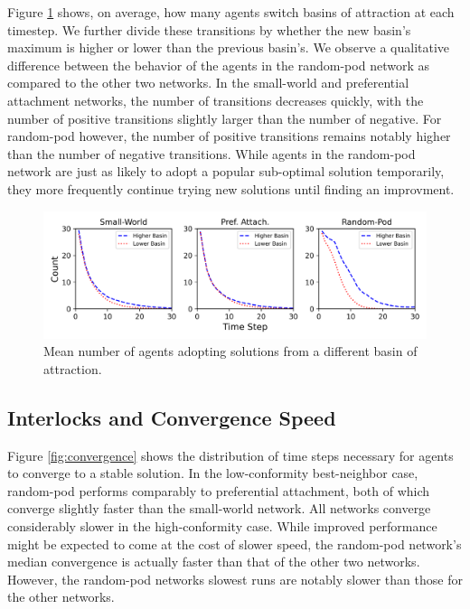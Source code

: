 \documentclass[manuscript,screen,review,acmsmall]{acmart}
\begin{document}
Figure \ref{fig:transitions} shows, on average,
how many agents switch basins of attraction at each timestep.
We further divide these transitions by whether the new basin's maximum is
higher or lower than the previous basin's.
We observe a qualitative difference between the behavior of the agents in the
random-pod network as compared to the other two networks.
In the small-world and preferential attachment networks,
the number of transitions decreases quickly, with the number of positive
transitions slightly larger than the number of negative.
For random-pod however,
the number of positive transitions remains notably higher than the number
of negative transitions.
While agents in the random-pod network are just as likely to adopt
a popular sub-optimal solution temporarily,
they more frequently continue trying new solutions until finding an
improvment.

\begin{figure}
\begin{center}
\includegraphics[width=5in]{fig-conform-transition-basin.png}
\caption{Mean number of agents adopting solutions from a different basin of attraction.}
\label{fig:transitions}
\end{center}
\end{figure}

\subsection{Interlocks and Convergence Speed}
Figure \ref{fig:convergence} shows the distribution of time steps necessary for agents to converge to a stable solution.
In the low-conformity best-neighbor case,
random-pod performs comparably to preferential attachment,
both of which converge slightly faster than the small-world network.
All networks converge considerably slower in the high-conformity case.
While improved performance might be expected to come at the cost of slower
speed,
the random-pod network's median convergence is actually faster than that of the other two networks.
However, the random-pod networks slowest runs are notably slower than those for the other networks.
\end{document}
